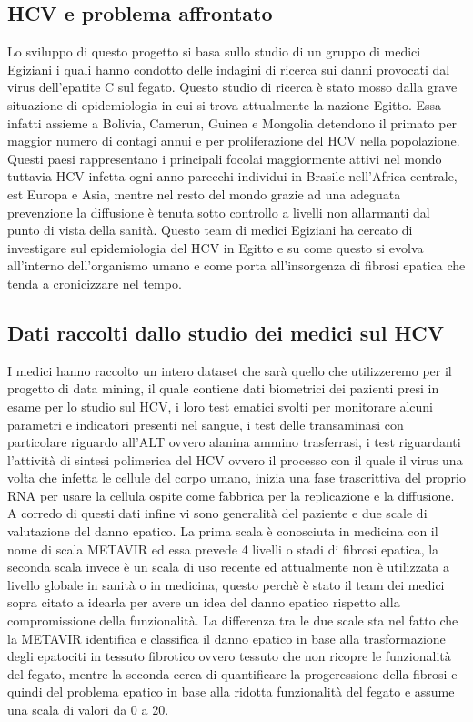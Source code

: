 \documentclass[italian,12pt,a4paper]{article}
\begin{document}
	\subsection{HCV e problema affrontato}
    Lo sviluppo di questo progetto si basa sullo studio di un gruppo di medici Egiziani i quali hanno condotto delle indagini di ricerca sui danni provocati dal virus dell'epatite C sul fegato. Questo studio di ricerca è stato mosso dalla grave situazione di epidemiologia in cui si trova attualmente la nazione Egitto. Essa infatti assieme a Bolivia, Camerun, Guinea e Mongolia detendono il primato per maggior numero di contagi annui e per proliferazione del HCV nella popolazione. Questi paesi rappresentano i principali focolai maggiormente attivi nel mondo tuttavia HCV infetta ogni anno parecchi individui in Brasile nell'Africa centrale, est Europa e Asia, mentre nel resto del mondo grazie ad una adeguata prevenzione la diffusione è tenuta sotto controllo a livelli non allarmanti dal punto di vista della sanità. Questo team di medici Egiziani ha cercato di investigare sul epidemiologia del HCV in Egitto e su come questo si evolva all'interno dell'organismo umano e come porta all'insorgenza di fibrosi epatica che tenda a cronicizzare nel tempo.
    \\
	
	\subsection{Dati raccolti dallo studio dei medici sul HCV}
	I medici hanno raccolto un intero dataset che sarà quello che utilizzeremo per il progetto di data mining, il quale contiene dati biometrici dei pazienti presi in esame per lo studio sul HCV, i loro test ematici svolti per monitorare alcuni parametri e indicatori presenti nel sangue, i test delle transaminasi con particolare riguardo all'ALT ovvero alanina ammino trasferrasi, i test riguardanti l'attività di sintesi polimerica del HCV ovvero il processo con il quale il virus una volta che infetta le cellule del corpo umano, inizia una fase trascrittiva del proprio RNA per usare la cellula ospite come fabbrica per la replicazione e la diffusione. A corredo di questi dati infine vi sono generalità del paziente e due scale di valutazione del danno epatico. La prima scala è conosciuta in medicina con il nome di scala METAVIR ed essa prevede 4 livelli o stadi di fibrosi epatica, la seconda scala invece è un scala di uso recente ed attualmente non è utilizzata a livello globale in sanità o in medicina, questo perchè è stato il team dei medici sopra citato a idearla per avere un idea del danno epatico rispetto alla compromissione della funzionalità. La differenza tra le due scale sta nel fatto che la METAVIR identifica e classifica il danno epatico in base alla trasformazione degli epatociti in tessuto fibrotico ovvero tessuto che non ricopre le funzionalità del fegato, mentre la seconda cerca di quantificare la progeressione della fibrosi e quindi del problema epatico in base alla ridotta funzionalità del fegato e assume una scala di valori da 0 a 20.
\end{document}
